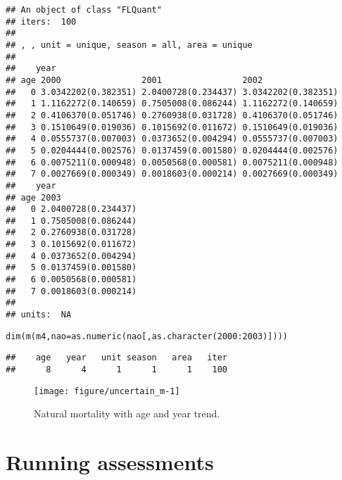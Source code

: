 \documentclass[a4paper,english,10pt]{article}\usepackage[]{graphicx}\usepackage[]{color}
\makeatletter
\def\maxwidth{ %
  \ifdim\Gin@nat@width>\linewidth
    \linewidth
  \else
    \Gin@nat@width
  \fi
}
\newcommand{\hlnum}[1]{\textcolor[rgb]{0.2,0.2,0.2}{#1}}%
\newcommand{\hlopt}[1]{\textcolor[rgb]{0.2,0.2,0.2}{#1}}%
\newcommand{\hlstd}[1]{\textcolor[rgb]{0,0,0}{#1}}%
\newcommand{\hlkwc}[1]{\textcolor[rgb]{0.361,0.506,0.596}{#1}}%
\newcommand{\hlkwd}[1]{\textcolor[rgb]{0.361,0.506,0.596}{#1}}%
\newenvironment{kframe}{%
 \def\at@end@of@kframe{}%
 \ifinner\ifhmode%
  \def\at@end@of@kframe{\end{minipage}}%
  \begin{minipage}{\columnwidth}%
 \fi\fi%
 \def\FrameCommand##1{\hskip\@totalleftmargin \hskip-\fboxsep
 \colorbox{shadecolor}{##1}\hskip-\fboxsep
     \hskip-\linewidth \hskip-\@totalleftmargin \hskip\columnwidth}%
 \MakeFramed {\advance\hsize-\width
   \@totalleftmargin\z@ \linewidth\hsize
   \@setminipage}}%
 {\par\unskip\endMakeFramed%
 \at@end@of@kframe}
\newenvironment{knitrout}{}{} %
\makeatother
\begin{document}
\begin{knitrout}
\begin{kframe}
\begin{verbatim}
## An object of class "FLQuant"
## iters:  100 
## 
## , , unit = unique, season = all, area = unique
## 
##    year
## age 2000                2001                2002               
##   0 3.0342202(0.382351) 2.0400728(0.234437) 3.0342202(0.382351)
##   1 1.1162272(0.140659) 0.7505008(0.086244) 1.1162272(0.140659)
##   2 0.4106370(0.051746) 0.2760938(0.031728) 0.4106370(0.051746)
##   3 0.1510649(0.019036) 0.1015692(0.011672) 0.1510649(0.019036)
##   4 0.0555737(0.007003) 0.0373652(0.004294) 0.0555737(0.007003)
##   5 0.0204444(0.002576) 0.0137459(0.001580) 0.0204444(0.002576)
##   6 0.0075211(0.000948) 0.0050568(0.000581) 0.0075211(0.000948)
##   7 0.0027669(0.000349) 0.0018603(0.000214) 0.0027669(0.000349)
##    year
## age 2003               
##   0 2.0400728(0.234437)
##   1 0.7505008(0.086244)
##   2 0.2760938(0.031728)
##   3 0.1015692(0.011672)
##   4 0.0373652(0.004294)
##   5 0.0137459(0.001580)
##   6 0.0050568(0.000581)
##   7 0.0018603(0.000214)
## 
## units:  NA
\end{verbatim}
\begin{alltt}
\hlkwd{dim}\hlstd{(}\hlkwd{m}\hlstd{(m4,} \hlkwc{nao}\hlstd{=}\hlkwd{as.numeric}\hlstd{(nao[,}\hlkwd{as.character}\hlstd{(}\hlnum{2000}\hlopt{:}\hlnum{2003}\hlstd{)])))}
\end{alltt}
\begin{verbatim}
##    age   year   unit season   area   iter 
##      8      4      1      1      1    100
\end{verbatim}
\end{kframe}
\end{knitrout}

\begin{knitrout}
\color{fgcolor}\begin{figure}[H]

{\centering \texttt{[image: figure/uncertain\_m-1]} 

}

\caption[Natural mortality with age and year trend]{Natural mortality with age and year trend.\label{fig:uncertain_m}}
\end{figure}


\end{knitrout}

\pagebreak
\section{Running assessments}\label{sec:sca}
\end{document}
